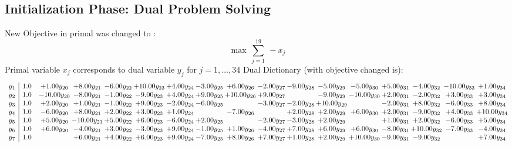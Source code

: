 \documentclass[9pt]{article}
\begin{document}
\subsection{Initialization Phase: Dual Problem Solving}
New Objective in primal was changed to : \[ \max\ \sum_{j=1}^{19}\ - x_j \] 
Primal variable $x_j$ corresponds to dual variable $y_j$ for $j = 1,\ldots,34$
Dual Dictionary (with objective changed is): 
\[\begin{array}{c| c c@{\hskip 2pt} c@{\hskip 2pt} c@{\hskip 2pt} c@{\hskip 2pt} c@{\hskip 2pt} c@{\hskip 2pt} c@{\hskip 2pt} c@{\hskip 2pt} c@{\hskip 2pt} c@{\hskip 2pt} c@{\hskip 2pt} c@{\hskip 2pt} c@{\hskip 2pt} c@{\hskip 2pt} c@{\hskip 2pt} }
 y_{1}   &  1.0 & +  1.00 y_{20} & +  8.00 y_{21} & -6.00 y_{22} & + 10.00 y_{23} & +  4.00 y_{24} & -3.00 y_{25} & +  6.00 y_{26} & -2.00 y_{27} & -9.00 y_{28} & -5.00 y_{29} & -5.00 y_{30} & +  5.00 y_{31} & -4.00 y_{32} & -10.00 y_{33} & +  1.00 y_{34}\\
 y_{2}   &  1.0 & -10.00 y_{20} & -8.00 y_{21} & -1.00 y_{22} & -9.00 y_{23} & +  4.00 y_{24} & +  9.00 y_{25} & + 10.00 y_{26} & +  9.00 y_{27} &   & -9.00 y_{29} & -10.00 y_{30} & +  2.00 y_{31} & -2.00 y_{32} & +  3.00 y_{33} & +  3.00 y_{34}\\
 y_{3}   &  1.0 & +  2.00 y_{20} & +  1.00 y_{21} & -1.00 y_{22} & +  9.00 y_{23} & -2.00 y_{24} & -6.00 y_{25} &   & -3.00 y_{27} & -2.00 y_{28} & + 10.00 y_{29} &   & -2.00 y_{31} & +  8.00 y_{32} & -6.00 y_{33} & +  8.00 y_{34}\\
 y_{4}   &  1.0 & -6.00 y_{20} & +  8.00 y_{21} & +  2.00 y_{22} & +  3.00 y_{23} & +  1.00 y_{24} &   & -7.00 y_{26} &   & +  2.00 y_{28} & +  2.00 y_{29} & +  6.00 y_{30} & +  2.00 y_{31} & -9.00 y_{32} & +  4.00 y_{33} & + 10.00 y_{34}\\
 y_{5}   &  1.0 & +  5.00 y_{20} & -10.00 y_{21} & +  5.00 y_{22} & +  6.00 y_{23} & -6.00 y_{24} & +  2.00 y_{25} &   & -2.00 y_{27} & -3.00 y_{28} & +  2.00 y_{29} &   & +  1.00 y_{31} & +  2.00 y_{32} & -6.00 y_{33} & +  5.00 y_{34}\\
 y_{6}   &  1.0 & +  6.00 y_{20} & -4.00 y_{21} & +  3.00 y_{22} & -3.00 y_{23} & +  9.00 y_{24} & -1.00 y_{25} & +  1.00 y_{26} & -4.00 y_{27} & +  7.00 y_{28} & +  6.00 y_{29} & +  6.00 y_{30} & -8.00 y_{31} & + 10.00 y_{32} & -7.00 y_{33} & -4.00 y_{34}\\
 y_{7}   &  1.0  &   & +  6.00 y_{21} & +  4.00 y_{22} & +  6.00 y_{23} & +  9.00 y_{24} & -7.00 y_{25} & +  8.00 y_{26} & +  7.00 y_{27} & +  1.00 y_{28} & +  2.00 y_{29} & + 10.00 y_{30} & -9.00 y_{31} & -9.00 y_{32} &   & +  7.00 y_{34}\\

\end{array}\]
\end{document}
